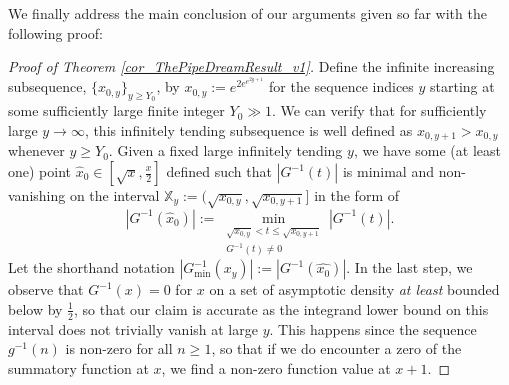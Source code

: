 \documentclass[11pt,reqno,a4letter]{article}
\numberwithin{figure}{section}
\numberwithin{table}{section}
\theoremstyle{plain}
\numberwithin{theorem}{section}
\theoremstyle{definition}
\begin{document}
We finally address the main conclusion of our arguments given so far with the 
following proof: 

\begin{proof}[Proof of Theorem \ref{cor_ThePipeDreamResult_v1}] 
\label{proofOf_cor_ThePipeDreamResult_v1} 
Define the infinite increasing subsequence, 
$\{x_{0,y}\}_{y \geq Y_0}$, by $x_{0,y} := e^{2e^{e^{2y+1}}}$ for the sequence indices $y$ 
starting at some sufficiently 
large finite integer $Y_0 \gg 1$. 
We can verify that for sufficiently large $y \rightarrow \infty$, this infinitely 
tending subsequence is well defined as $x_{0,y+1} > x_{0,y}$ whenever $y \geq Y_0$. 
Given a fixed large infinitely tending $y$, we have some (at least one) point 
$\widehat{x}_0 \in \left[\sqrt{x}, \frac{x}{2}\right]$ defined such that 
$|G^{-1}(t)|$ is minimal and non-vanishing on the interval 
$\mathbb{X}_y := (\sqrt{x_{0,y}}, \sqrt{x_{0,y+1}}]$ 
in the form of 
\[
\left\lvert G^{-1}(\widehat{x}_0) \right\rvert := 
     \min_{\substack{\sqrt{x_{0,y}} < t \leq \sqrt{x_{0,y+1}} \\ G^{-1}(t) \neq 0}} |G^{-1}(t)|. 
\] 
Let the shorthand notation $|G_{\min}^{-1}(x_y)| := |G^{-1}(\widehat{x_0})|$. 
In the last step, we observe that $G^{-1}(x) = 0$ for $x$ on a set of 
asymptotic density \emph{at least} bounded below by $\frac{1}{2}$, so that our 
claim is accurate as the integrand lower bound on this interval 
does not trivially vanish at large $y$. This happens since the sequence 
$g^{-1}(n)$ is non-zero for all $n \geq 1$, so that if we do encounter a zero of the 
summatory function at $x$, we find a non-zero function value at $x+1$. 


\end{proof}
\end{document}
